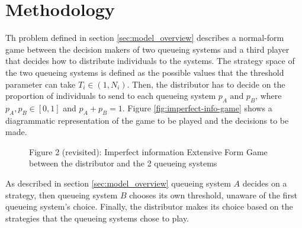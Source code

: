 \section{Methodology}\label{sec:methodology}

Th problem defined in section \ref{sec:model_overview} describes a normal-form
game between the decision makers of two queueing systems and a third player that 
decides how to distribute individuals to the systems.
The strategy space of the two queueing systems is defined as the possible values
that the threshold parameter can take \(T_i \in (1, N_i)\).
Then, the distributor has to decide on the proportion of individuals to send to 
each queueing system \(p_A \text{ and } p_B\), where \(p_A, p_B \in [0, 1] \)
and \(p_A + p_B = 1\).
Figure \ref{fig:imperfect-info-game} shows a diagrammatic 
representation of the game to be played and the decisions to be made.

\begin{figure}[ht]
    \centering
    \caption*{Figure 2 (revisited): Imperfect information Extensive Form Game 
    between the distributor and the 2 queueing systems}
\end{figure}

As described in section \ref{sec:model_overview} queueing system \(A\) decides
on a strategy, then queueing system \(B\) chooses its own threshold, unaware 
of the first queueing system's choice.
Finally, the distributor makes its choice based on the strategies that the 
queueing systems chose to play. 


